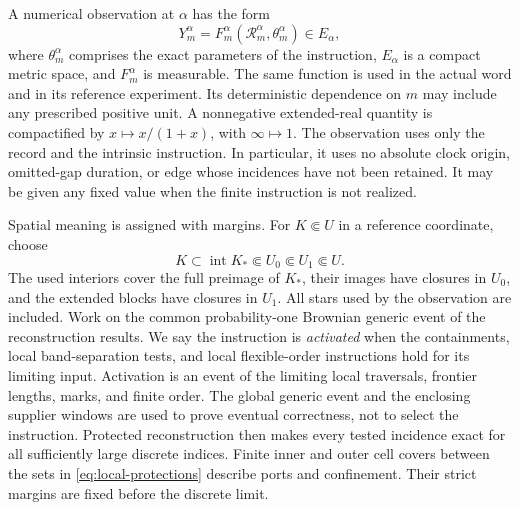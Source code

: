 A numerical observation at \(\alpha\) has the form
\begin{equation}
 Y_m^\alpha
   =F_m^\alpha(\mathcal R_m^\alpha,\theta_m^\alpha)\in E_\alpha ,
 \label{eq:finite-readout}
\end{equation}
where \(\theta_m^\alpha\) comprises the exact parameters of the
instruction, \(E_\alpha\) is a compact metric space, and \(F_m^\alpha\)
is measurable.  The same function is used in the actual word and in its
reference experiment.  Its deterministic dependence on \(m\) may include
any prescribed positive unit.  A nonnegative extended-real quantity is
compactified by \(x\mapsto x/(1+x)\), with \(\infty\mapsto1\).
The observation uses only the record and the intrinsic instruction.  In
particular, it uses no absolute clock origin, omitted-gap duration, or
edge whose incidences have not been retained.  It may be given any fixed
value when the finite instruction is not realized.

Spatial meaning is assigned with margins.  For \(K\Subset U\) in a
reference coordinate, choose
\begin{equation}
 K\subset\operatorname{int}K_*
   \Subset U_0\Subset U_1\Subset U .
 \label{eq:local-protections}
\end{equation}
The used interiors cover the full preimage of \(K_*\), their images have
closures in \(U_0\), and the extended blocks have closures in \(U_1\).
All stars used by the observation are included.  Work on the common
probability-one Brownian generic event of the reconstruction results.
We say the instruction is \emph{activated} when the containments, local
band-separation tests, and local flexible-order instructions hold for its
limiting input.  Activation is an event of the limiting local traversals,
frontier lengths, marks, and finite order.  The global generic event and
the enclosing supplier windows are used to prove eventual correctness,
not to select the instruction.  Protected reconstruction then makes
every tested incidence exact for all sufficiently large discrete indices.
Finite inner and outer cell covers between the sets in
\eqref{eq:local-protections} describe ports and confinement.  Their
strict margins are fixed before the discrete limit.

